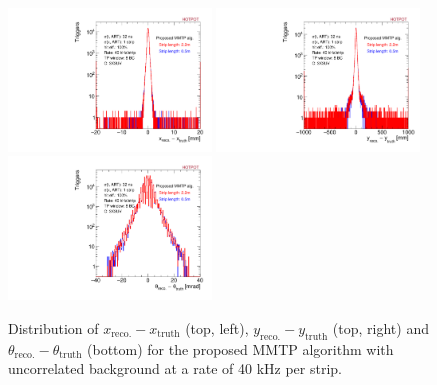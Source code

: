 \begin{figure}[!htpb]
  \begin{center}
    \includegraphics[width=0.48\textwidth]{figures/xres_new.pdf}
    \includegraphics[width=0.48\textwidth]{figures/yres_new.pdf}
    \includegraphics[width=0.48\textwidth]{figures/mres_new.pdf}
  \end{center}
  \vspace{-10pt}
  \caption{Distribution of $x_\text{reco.} - x_\text{truth}$ (top, left), $y_\text{reco.} - y_\text{truth}$ (top, right) and $\theta_\text{reco.} - \theta_\text{truth}$ (bottom) for the proposed MMTP algorithm with uncorrelated background at a rate of 40 kHz per strip.}
  \label{fig:resolutions_new}
\end{figure}

